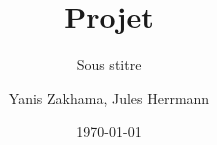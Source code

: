 \documentclass{beamer}
\title {Projet}
\subtitle{Sous stitre}
\author{Yanis Zakhama, Jules Herrmann}
\institute{Master MFA}
\date{\today}
\begin{document}
\begin{frame}
\titlepage
\end{frame}

\begin{frame}
\cite{dummy_article}
\end{frame}

\begin{frame}


\end{frame}
\end{document}
